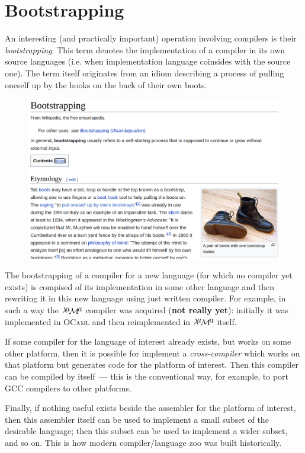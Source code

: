 \documentclass{article}
\newcommand{\lama}{$\lambda\kern -.1667em\lower -.5ex\hbox{$a$}\kern -.1000em\lower .2ex\hbox{$\mathcal M$}\kern -.1000em\lower -.5ex\hbox{$a$}$\xspace}
\begin{document}
\section{Bootstrapping}

An interesting (and practically important) operation involving compilers is their \emph{bootstrapping}. This term denotes the
implementation of a compiler in its own source languages (i.e. when implementation language coinsides with the source one).
The term itself originates from an idiom describing a process of pulling oneself up by the hooks on the back of their own
boots.

\begin{figure}[h]
  \centering
  \includegraphics[scale=0.2]{images/bootstrapping.png}
\end{figure}

The bootstrapping of a compiler for a new language (for which no compiler yet exists) is compised of its implementation
in some other language and then rewriting it in this new language using just written compiler. For example, in such a way the \lama compiler was
acquired (\textbf{not really yet}): initially it was implemented in \textsc{OCaml} and then reimplemented in
\lama itself.

If some compiler for the language of interest already exists, but works on some other platform, then it is possible for
implement a \emph{cross-compiler} which works on that platform but generates code for the platform of interest. Then
this compiler can be compiled by itself~--- this is the conventional way, for example, to port \textsc{GCC} compilers
to other platforms.

Finally, if nothing useful exists beside the assembler for the platform of interest, then this assembler itself can be
used to implement a small subset of the desirable language; then this subset can be used to implement a wider subset, and so on.
This is how modern compiler/language zoo was built historically.
\end{document}

